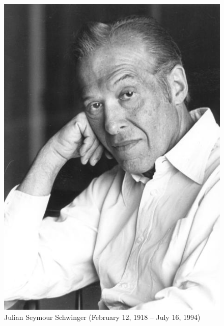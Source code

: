 \begin{refsection}
\begin{figure}
   \centering
   \includegraphics[scale=.35]{./Images/schwinger}
   \caption{Julian Seymour Schwinger (February 12, 1918 -- July 16, 1994) }
\end{figure}

\printbibliography[heading=subbibliography]
\end{refsection}

